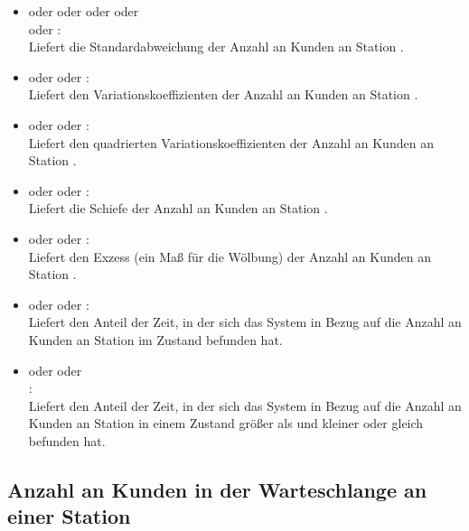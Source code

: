 \begin{itemize}
\item
{} oder  oder  oder  oder\\
 oder :\\
Liefert die Standardabweichung der Anzahl an Kunden an Station .

\item
{} oder  oder :\\
Liefert den Variationskoeffizienten der Anzahl an Kunden an Station .

\item
{} oder  oder :\\
Liefert den quadrierten Variationskoeffizienten der Anzahl an Kunden an Station .

\item
{} oder  oder :\\
Liefert die Schiefe der Anzahl an Kunden an Station .

\item
{} oder  oder :\\
Liefert den Exzess (ein Maß für die Wölbung) der Anzahl an Kunden an Station .

\item
{} oder  oder :\\
Liefert den Anteil der Zeit, in der sich das System in Bezug auf die Anzahl an Kunden an Station  im Zustand  befunden hat.

\item
{} oder  oder\\
:\\
Liefert den Anteil der Zeit, in der sich das System in Bezug auf die Anzahl an Kunden an Station  in einem Zustand größer als  und kleiner oder gleich  befunden hat.

\end{itemize}



\subsection{Anzahl an Kunden in der Warteschlange an einer Station}

